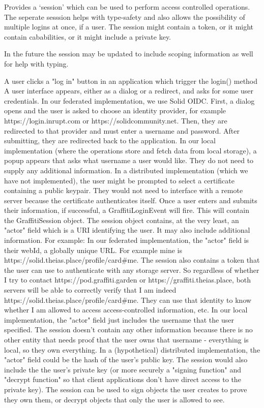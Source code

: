 Provides a `session' which can be used to perform access controlled operations.
The seperate sesssion helps with type-safety and also allows the possibility of multiple logins
at once, if a user.
The session might contain a token, or it might contain cababilities, or it might include a private key.

In the future the session may be updated to include scoping information as well for help with typing.

A user clicks a "log in" button in an application which trigger the login() method
    A user interface appears, either as a dialog or a redirect, and asks for some user credentials.
        In our federated implementation, we use Solid OIDC. First, a dialog opens and the user is asked to choose an identity provider, for example https://login.inrupt.com or https://solidcommunity.net. Then, they are redirected to that provider and must enter a username and password. After submitting, they are redirected back to the application.
        In our local implementation (where the operations store and fetch data from local storage), a popup appears that asks what username a user would like. They do not need to supply any additional information.
        In a distributed implementation (which we have not implemented), the user might be prompted to select a certificate containing a public keypair. They would not need to interface with a remote server because the certificate authenticates itself.
    Once a user enters and submits their information, if successful, a GraffitiLoginEvent will fire. This will contain the GraffitiSession object. The session object contains, at the very least, an "actor" field which is a URI identifying the user. It may also include additional information. For example:
        In our federated implementation, the "actor" field is their webId, a globally unique URL. For example mine is https://solid.theias.place/profile/card#me. The session also contains a token that the user can use to authenticate with any storage server. So regardless of whether I try to contact https://pod.graffiti.garden or https://graffiti.theias.place, both servers will be able to correctly verify that I am indeed https://solid.theias.place/profile/card#me. They can use that identity to know whether I am allowed to access access-controlled information, etc.
        In our local implementation, the "actor" field just includes the username that the user specified. The session doesn't contain any other information because there is no other entity that needs proof that the user owns that username - everything is local, so they own everything.
        In a (hypothetical) distributed implementation, the "actor" field could be the hash of the user's public key. The session would also include the the user's private key (or more securely a "signing function" and "decrypt function" so that client applications don't have direct access to the private key). The session can be used to sign objects the user creates to prove they own them, or decrypt objects that only the user is allowed to see.

